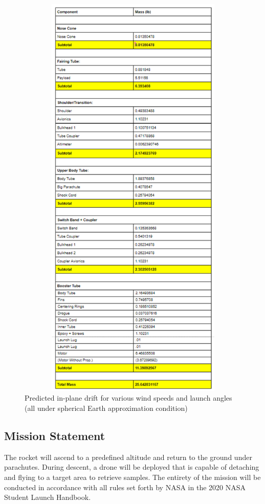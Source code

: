 \FloatBarrier
\begin{figure}[h]
    \centering
    \includegraphics[width = 15cm, height = 20cm]{Masses.png}
    \caption{Predicted in-plane drift for various wind speeds and launch angles (all under spherical Earth approximation condition)}
    \label{fig:my_label}
\end{figure}

    \subsection{Mission Statement}
The rocket will ascend to a predefined altitude and return to the ground under parachutes. During descent, a drone will be deployed that is capable of detaching and flying to a target area to retrieve samples. The entirety of the mission will be conducted in accordance with all rules set forth by NASA in the 2020 NASA Student Launch Handbook.
   
